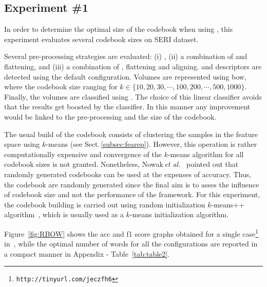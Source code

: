 \subsection{Experiment \#1}\label{subsec:exp1}
%
%
%
%

In order to determine the optimal size of the codebook when using \bow, this experiment evaluates several codebook sizes on SERI dataset.

Several pre-processing strategies are evaluated: (i) \nlm, (ii) a combination of \nlm and flattening, and (iii) a combination of \nlm, flattening and aligning.
\lbp and \lbptop descriptors are detected using the default configuration.
Volumes are represented using \ac{bow}, where the codebook size ranging for $k \in \{10, 20, 30, \cdots, 100, 200, \cdots, 500, 1000\}$.
Finally, the volumes are classified using \lr.
The choice of this linear classifier avoids that the results get boosted by the classifier. In this manner any improvement would be linked to the pre-processing and the size of the codebook.
%

The usual build of the codebook consists of clustering the samples in the feature space using $k$-means (see Sect.\,\ref{subsec:fearep}).
However, this operation is rather computationally expensive and convergence of the $k$-means algorithm for all codebook sizes is not granted.
Nonetheless, Nowak\,\textit{et al.}~\cite{nowak2006sampling} pointed out that randomly generated codebooks can be used at the expenses of accuracy.
Thus, the codebook are randomly generated since the final aim is to asses the influence of codebook size and not the performance of the framework.
For this experiment, the codebook building is carried out using random initialization $k$-means++ algorithm~\cite{arthur2007k}, which is usually used as a $k$-means initialization algorithm.

Figure~\ref{fig:RBOW} shows the \ac{acc} and \ac{f1} score graphs obtained for a single case\footnote{\texttt{http://tinyurl.com/jeczfh6}} in~\cite{Lemaitre2015}, while the optimal number of words for all the configurations are reported in a compact manner in Appendix - Table~\ref{tab:table2}.

